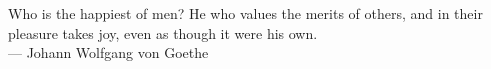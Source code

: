 \thispagestyle{empty}
{}

\vspace*{3cm}

\begin{center}
	Who is the happiest of men? He who values the merits of others, and in their pleasure takes joy, even as though it were his own. \\ \medskip 
	--- Johann Wolfgang von Goethe
\end{center}


